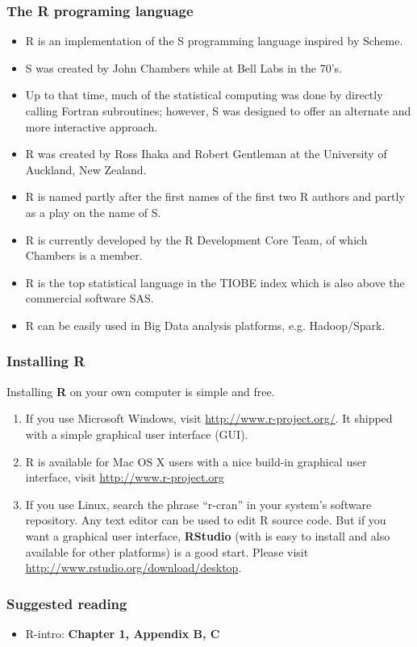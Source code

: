 \documentclass[10pt]{beamer}
\begin{document}
\begin{frame}
  \frametitle{The R programing language}

  \begin{itemize}
  \item R is an implementation of the S programming language inspired by Scheme.

  \item S was created by John Chambers while at Bell Labs in the 70's.

  \item Up to that time, much of the statistical computing was done by directly
    calling Fortran subroutines; however, S was designed to offer an alternate
    and more interactive approach.

  \item R was created by Ross Ihaka and Robert Gentleman at the University of
    Auckland, New Zealand.

  \item R is named partly after the first names of the first two R authors and
    partly as a play on the name of S.

  \item R is currently developed by the R Development Core
    Team, of which Chambers is a member.

  \item R is the top statistical language in the TIOBE index which is also
    above the commercial software SAS.

  \item R can be easily used in Big Data analysis platforms, e.g. Hadoop/Spark.

  \end{itemize}
\end{frame}


\begin{frame}
\frametitle{Installing R}
Installing \textbf{R} on your own computer is simple and free.
\begin{enumerate}
\item If you use Microsoft Windows, visit
  \url{http://www.r-project.org/}. It shipped with a simple graphical user
  interface (GUI).

\item R is available for Mac OS X users with a nice build-in graphical user
  interface, visit \url{http://www.r-project.org}

\item If you use Linux, search the phrase ``r-cran'' in your system's software
  repository. Any text editor can be used to edit R source code. But if you
  want a graphical user interface, \textbf{RStudio} (with is easy to install and also
  available for other platforms) is a good start. Please visit
  \url{http://www.rstudio.org/download/desktop}.
\end{enumerate}
\end{frame}


\begin{frame}
  \frametitle{Suggested reading}

  \begin{itemize}
  \item R-intro: \textbf{Chapter 1, Appendix B, C}
  \end{itemize}

\end{frame}
\end{document}
